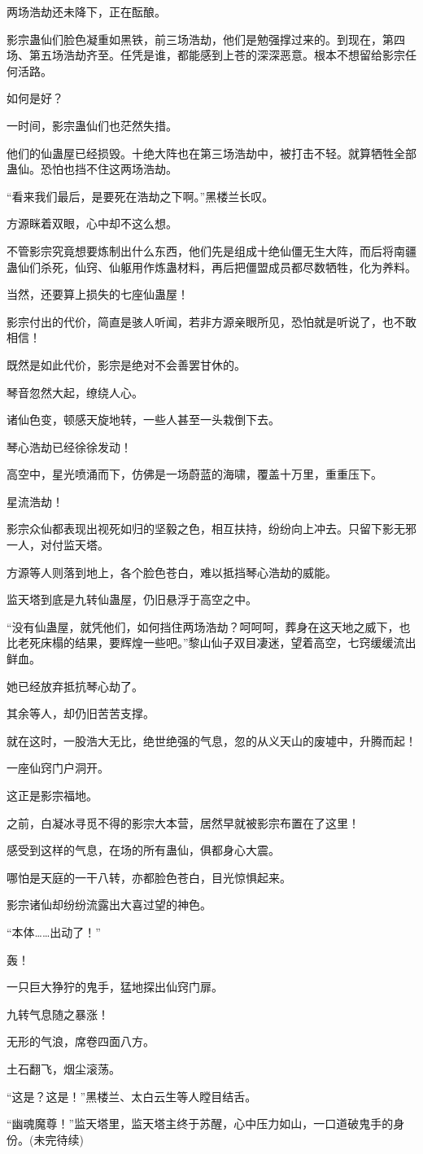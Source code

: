 \begin{this_body}
两场浩劫还未降下，正在酝酿。

影宗蛊仙们脸色凝重如黑铁，前三场浩劫，他们是勉强撑过来的。到现在，第四场、第五场浩劫齐至。任凭是谁，都能感到上苍的深深恶意。根本不想留给影宗任何活路。

如何是好？

一时间，影宗蛊仙们也茫然失措。

他们的仙蛊屋已经损毁。十绝大阵也在第三场浩劫中，被打击不轻。就算牺牲全部蛊仙。恐怕也挡不住这两场浩劫。

“看来我们最后，是要死在浩劫之下啊。”黑楼兰长叹。

方源眯着双眼，心中却不这么想。

不管影宗究竟想要炼制出什么东西，他们先是组成十绝仙僵无生大阵，而后将南疆蛊仙们杀死，仙窍、仙躯用作炼蛊材料，再后把僵盟成员都尽数牺牲，化为养料。

当然，还要算上损失的七座仙蛊屋！

影宗付出的代价，简直是骇人听闻，若非方源亲眼所见，恐怕就是听说了，也不敢相信！

既然是如此代价，影宗是绝对不会善罢甘休的。

琴音忽然大起，缭绕人心。

诸仙色变，顿感天旋地转，一些人甚至一头栽倒下去。

琴心浩劫已经徐徐发动！

高空中，星光喷涌而下，仿佛是一场蔚蓝的海啸，覆盖十万里，重重压下。

星流浩劫！

影宗众仙都表现出视死如归的坚毅之色，相互扶持，纷纷向上冲去。只留下影无邪一人，对付监天塔。

方源等人则落到地上，各个脸色苍白，难以抵挡琴心浩劫的威能。

监天塔到底是九转仙蛊屋，仍旧悬浮于高空之中。

“没有仙蛊屋，就凭他们，如何挡住两场浩劫？呵呵呵，葬身在这天地之威下，也比老死床榻的结果，要辉煌一些吧。”黎山仙子双目凄迷，望着高空，七窍缓缓流出鲜血。

她已经放弃抵抗琴心劫了。

其余等人，却仍旧苦苦支撑。

就在这时，一股浩大无比，绝世绝强的气息，忽的从义天山的废墟中，升腾而起！

一座仙窍门户洞开。

这正是影宗福地。

之前，白凝冰寻觅不得的影宗大本营，居然早就被影宗布置在了这里！

感受到这样的气息，在场的所有蛊仙，俱都身心大震。

哪怕是天庭的一干八转，亦都脸色苍白，目光惊惧起来。

影宗诸仙却纷纷流露出大喜过望的神色。

“本体……出动了！”

轰！

一只巨大狰狞的鬼手，猛地探出仙窍门扉。

九转气息随之暴涨！

无形的气浪，席卷四面八方。

土石翻飞，烟尘滚荡。

“这是？这是！”黑楼兰、太白云生等人瞠目结舌。

“幽魂魔尊！”监天塔里，监天塔主终于苏醒，心中压力如山，一口道破鬼手的身份。(未完待续)

\end{this_body}

